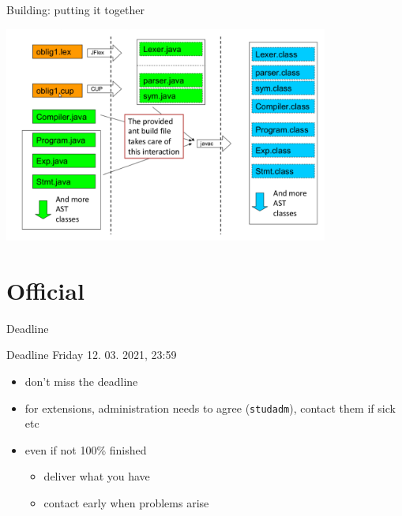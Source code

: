 \documentclass{beamer}
\begin{document}
\begin{frame}[label={sec:org6b87748}]{Building: putting it together}

\begin{center}
 \includegraphics[width=0.8\textwidth]{figures/snaps/buildprocess}
\end{center}
\end{frame}

\section{Official}
\label{sec:org6ae5553}

\begin{frame}[label={sec:orgd7cb7f7},fragile]{Deadline}
 \begin{alertblock}{Deadline}
\alert{Friday 12. 03. 2021, 23:59}
\end{alertblock}


\begin{itemize}
\item don't miss the deadline
\item for extensions, administration needs to agree (\texttt{studadm}), contact them
if sick etc
\item even if not 100\% finished
\begin{itemize}
\item deliver what you have
\item contact early when problems arise
\end{itemize}
\end{itemize}
\end{frame}
\end{document}
